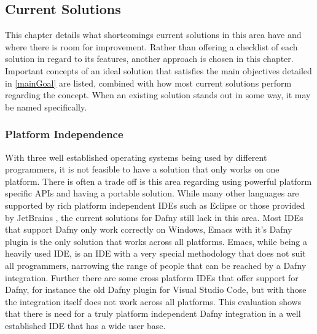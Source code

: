\subsection{Current Solutions}\label{cursol}
This chapter details what shortcomings current solutions in this area have and where there is room for improvement. Rather than offering a checklist of each solution in regard to its features, another approach is chosen in this chapter. Important concepts of an ideal solution that satisfies the main objectives detailed in \ref{mainGoal} are listed, combined with how most current solutions perform regarding the concept. When an existing solution stands out in some way, it may be named specifically. \newline

\subsubsection{Platform Independence}
With three well established operating systems being used by different programmers, it is not feasible to have a solution that only works on one platform. There is often a trade off is this area regarding using powerful platform specific APIs and having a portable solution. While many other languages are supported by rich platform independent IDEs such as Eclipse \cite{eclipse} or those provided by JetBrains \cite{jetbrains}, the current solutions for Dafny still lack in this area. \newline
Most IDEs that support Dafny only work correctly on Windows, Emacs \cite{GNU} with it's Dafny plugin is the only solution that works across all platforms. Emacs, while being a heavily used IDE, is an IDE with a very special methodology that does not suit all programmers, narrowing the range of people that can be reached by a Dafny integration. Further there are some cross platform IDEs that offer support for Dafny, for instance the old Dafny plugin for Visual Studio Code, but with those the integration itself does not work across all platforms. \newline
This evaluation shows that there is need for a truly platform independent Dafny integration in a well established IDE that has a wide user base. \newline
 
